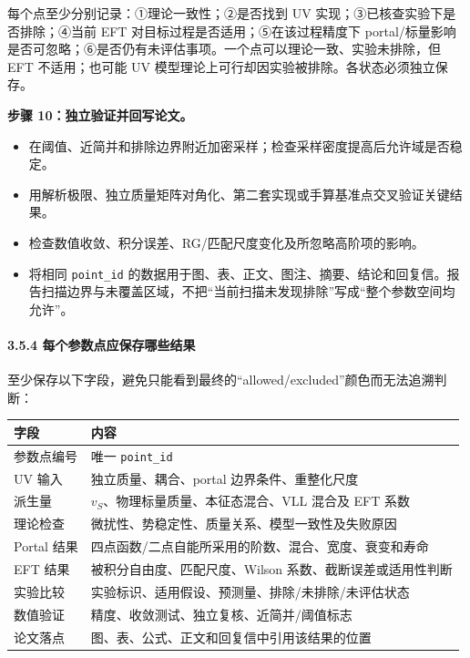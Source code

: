 \documentclass[
]{article}
\providecommand{\tightlist}{%
  \setlength{\itemsep}{0pt}\setlength{\parskip}{0pt}}
\begin{document}
每个点至少分别记录：①理论一致性；②是否找到 UV
实现；③已核查实验下是否排除；④当前 EFT
对目标过程是否适用；⑤在该过程精度下
portal/标量影响是否可忽略；⑥是否仍有未评估事项。一个点可以理论一致、实验未排除，但
EFT 不适用；也可能 UV 模型理论上可行却因实验被排除。各状态必须独立保存。

\textbf{步骤 10：独立验证并回写论文。}

\begin{itemize}
\tightlist
\item
  在阈值、近简并和排除边界附近加密采样；检查采样密度提高后允许域是否稳定。
\item
  用解析极限、独立质量矩阵对角化、第二套实现或手算基准点交叉验证关键结果。
\item
  检查数值收敛、积分误差、RG/匹配尺度变化及所忽略高阶项的影响。
\item
  将相同 \texttt{point\_id}
  的数据用于图、表、正文、图注、摘要、结论和回复信。报告扫描边界与未覆盖区域，不把``当前扫描未发现排除''写成``整个参数空间均允许''。
\end{itemize}

\paragraph{3.5.4
每个参数点应保存哪些结果}\label{ux6bcfux4e2aux53c2ux6570ux70b9ux5e94ux4fddux5b58ux54eaux4e9bux7ed3ux679c}

至少保存以下字段，避免只能看到最终的``allowed/excluded''颜色而无法追溯判断：

\begin{longtable}[]{@{}ll@{}}
\toprule\noalign{}
字段 & 内容 \\
\midrule\noalign{}
\endhead
\bottomrule\noalign{}
\endlastfoot
参数点编号 & 唯一 \texttt{point\_id} \\
UV 输入 & 独立质量、耦合、portal 边界条件、重整化尺度 \\
派生量 & \(v_S\)、物理标量质量、本征态混合、VLL 混合及 EFT 系数 \\
理论检查 & 微扰性、势稳定性、质量关系、模型一致性及失败原因 \\
Portal 结果 & 四点函数/二点自能所采用的阶数、混合、宽度、衰变和寿命 \\
EFT 结果 & 被积分自由度、匹配尺度、Wilson 系数、截断误差或适用性判断 \\
实验比较 & 实验标识、适用假设、预测量、排除/未排除/未评估状态 \\
数值验证 & 精度、收敛测试、独立复核、近简并/阈值标志 \\
论文落点 & 图、表、公式、正文和回复信中引用该结果的位置 \\
\end{longtable}
\end{document}
